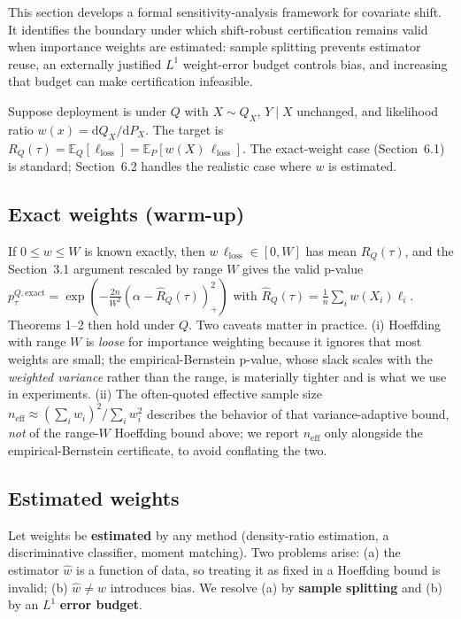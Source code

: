 \documentclass{ieeeaccess}
\begin{document}
This section develops a formal sensitivity-analysis framework for covariate shift. It identifies the boundary under which shift-robust certification remains valid when importance weights are estimated: sample splitting prevents estimator reuse, an externally justified $L^1$ weight-error budget controls bias, and increasing that budget can make certification infeasible.

Suppose deployment is under $Q$ with $X\sim Q_X$, $Y\mid X$ unchanged, and likelihood ratio $w(x)=\mathrm dQ_X/\mathrm dP_X$. The target is $R_Q(\tau)=\mathbb E_Q[\ell_{\mathrm{loss}}]=\mathbb E_P[w(X)\,\ell_{\mathrm{loss}}]$. The exact-weight case (Section~6.1) is standard; Section~6.2 handles the realistic case where $w$ is estimated.

\subsection{Exact weights (warm-up)}

If $0\le w\le W$ is known exactly, then $w\,\ell_{\mathrm{loss}}\in[0,W]$ has mean $R_Q(\tau)$, and the Section~3.1 argument rescaled by range $W$ gives the valid p-value $p^{Q,\mathrm{exact}}_\tau=\exp(-\frac{2n}{W^2}(\alpha-\hat R_Q(\tau))_+^2)$ with $\hat R_Q(\tau)=\frac1n\sum_i w(X_i)\ell_i$. Theorems 1--2 then hold under $Q$. Two caveats matter in practice. (i) Hoeffding with range $W$ is \emph{loose} for importance weighting because it ignores that most weights are small; the empirical-Bernstein p-value, whose slack scales with the \emph{weighted variance} rather than the range, is materially tighter and is what we use in experiments. (ii) The often-quoted effective sample size $n_{\mathrm{eff}}\approx(\sum_i w_i)^2/\sum_i w_i^2$ describes the behavior of that variance-adaptive bound, \emph{not} of the range-$W$ Hoeffding bound above; we report $n_{\mathrm{eff}}$ only alongside the empirical-Bernstein certificate, to avoid conflating the two.

\subsection{Estimated weights}

Let weights be \textbf{estimated} by any method (density-ratio estimation, a discriminative classifier, moment matching). Two problems arise: (a) the estimator $\hat w$ is a function of data, so treating it as fixed in a Hoeffding bound is invalid; (b) $\hat w\ne w$ introduces bias. We resolve (a) by \textbf{sample splitting} and (b) by an $L^1$ \textbf{error budget}.
\end{document}
